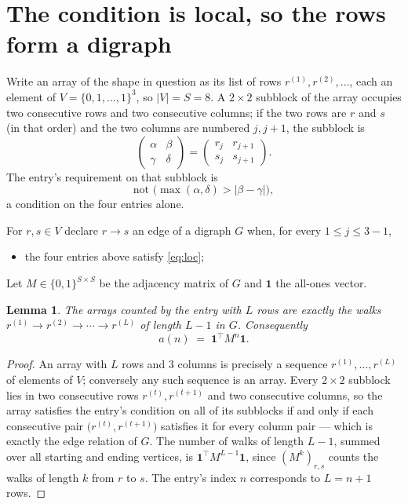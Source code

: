 \documentclass[11pt,a4paper]{article}
\theoremstyle{plain}
\newtheorem{lemma}[theorem]{Lemma}
\theoremstyle{definition}
\begin{document}
\section{The condition is local, so the rows form a digraph}

Write an array of the shape in question as its list of rows
$r^{(1)},r^{(2)},\dots$, each an element of
$V=\{0,1,\dots,1\}^{3}$, so $|V|=S=8$. A $2\times2$ subblock of the array
occupies two consecutive rows and two consecutive columns; if the two rows are $r$
and $s$ (in that order) and the two columns are numbered $j,j+1$,
the subblock is
\[
\begin{pmatrix}\alpha&\beta\\\gamma&\delta\end{pmatrix}=\begin{pmatrix}r_j&r_{j+1}\\s_j&s_{j+1}\end{pmatrix}.
\]
The entry's requirement on that subblock is
\begin{equation}\label{eq:loc}
\text{not }\bigl(\max(\alpha,\delta)>|\beta-\gamma|\bigr),
\end{equation}
a condition on the four entries alone.

For $r,s\in V$ declare $r\to s$ an edge of a digraph $G$ when, for every
$1\le j\le 3-1$,
\begin{itemize}
\item the four entries above satisfy \eqref{eq:loc};

\end{itemize}
Let $M\in\{0,1\}^{S\times S}$ be the adjacency matrix of $G$ and $\mathbf{1}$ the
all-ones vector.

\begin{lemma}\label{lem:walk}
The arrays counted by the entry with $L$ rows are exactly the walks
$r^{(1)}\to r^{(2)}\to\cdots\to r^{(L)}$ of length $L-1$ in $G$. Consequently
\[
a(n)\;=\;\mathbf{1}^{\!\top}M^{n}\mathbf{1} .
\]
\end{lemma}

\begin{proof}
An array with $L$ rows and $3$ columns is precisely a sequence
$r^{(1)},\dots,r^{(L)}$ of elements of $V$; conversely any such sequence is an array.
Every $2\times2$ subblock lies in two consecutive rows $r^{(t)},r^{(t+1)}$ and two
consecutive columns, so the array satisfies the entry's condition on all of its subblocks
if and only if each consecutive pair $\bigl(r^{(t)},r^{(t+1)}\bigr)$ satisfies it for
every column pair --- which is exactly the edge relation of $G$. The number of walks of
length $L-1$, summed over all starting and ending vertices, is
$\mathbf{1}^{\!\top}M^{L-1}\mathbf{1}$, since $(M^{k})_{r,s}$ counts the walks of
length $k$ from $r$ to $s$. The entry's index $n$ corresponds to $L=n+1$ rows.
\end{proof}
\end{document}

